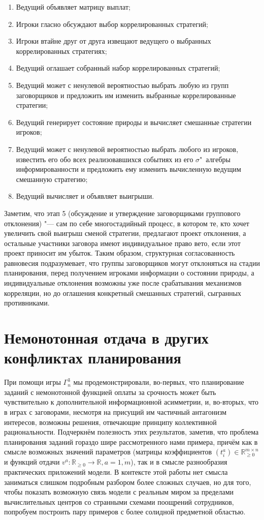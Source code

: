 \begin{enumerate}
	\item Ведущий объявляет матрицу выплат;
	\item Игроки гласно обсуждают выбор коррелированных стратегий;
	\item Игроки втайне друг от друга извещают ведущего о выбранных коррелированных стратегиях;
	\item Ведущий оглашает собранный набор коррелированных стратегий;
	\item Ведущий может с ненулевой вероятностью выбрать любую из групп заговорщиков и предложить им изменить выбранные коррелированные стратегии;
	\item Ведущий генерирует состояние природы и вычисляет смешанные стратегии игроков;
	\item Ведущий может с ненулевой вероятностью выбрать любого из игроков, известить его обо всех реализовавшихся событиях из его $\sigma$"~алгебры информированности и предложить ему изменить вычисленную ведущим смешанную стратегию;
	\item Ведущий вычисляет и объявляет выигрыши.
\end{enumerate}

Заметим, что этап 5 (обсуждение и утверждение заговорщиками группового отклонения) "--- сам по себе многостадийный процесс, в котором те, кто хочет увеличить свой выигрыш сменой стратегии, предлагают проект отклонения, а остальные участники заговора имеют индивидуальное право вето, если этот проект приносит им убыток. Таким образом, структурная согласованность равновесия подразумевает, что группы заговорщиков могут отклоняться на стадии планирования, перед получением игроками информации о состоянии природы, а индивидуальные отклонения возможны уже после срабатывания механизмов корреляции, но до оглашения конкретный смешанных стратегий, сыгранных противниками.

\section{Немонотонная отдача в других конфликтах планирования}\label{sec:ch2/sec7}

При помощи игры $\Gamma^3_n$ мы продемонстрировали, во-первых, что планирование заданий с немонотонной функцией оплаты за срочность может быть чувствительно к дополнительной информационной асимметрии, и, во-вторых, что в играх с заговорами, несмотря на присущий им частичный антагонизм интересов, возможны решения, отвечающие принципу коллективной рациональности. Подчеркнём полезность этих результатов, заметив, что проблема планирования заданий гораздо шире рассмотренного нами примера, причём как в смысле возможных значений параметров (матрицы коэффициентов $(t_i^a) \in \mathbb{R}_{\ge 0}^{m \times n}$ и функций отдачи $v^a : \mathbb{R}_{\ge 0} \rightarrow \mathbb{R}, a = \overline{1,m}$), так и в смысле разнообразия практических приложений модели. В контексте этой работы нет смысла заниматься слишком подробным разбором более сложных случаев, но для того, чтобы показать возможную связь модели с реальным миром за пределами вычислительных центров со странными схемами поощрений сотрудников, попробуем построить пару примеров с более солидной предметной областью.

